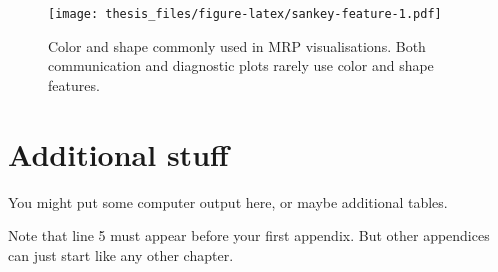 \documentclass{monashthesis}
\begin{document}
\begin{figure}
\centering
\texttt{[image: thesis\_files/figure-latex/sankey-feature-1.pdf]}
\caption{\label{fig:sankey-feature}Color and shape commonly used in MRP visualisations. Both communication and diagnostic plots rarely use color and shape features.}
\end{figure}

\appendix

\hypertarget{additional-stuff}{%
\chapter{Additional stuff}\label{additional-stuff}}

You might put some computer output here, or maybe additional tables.

Note that line 5 must appear before your first appendix. But other appendices can just start like any other chapter.

\printbibliography[heading=bibintoc]
\end{document}
